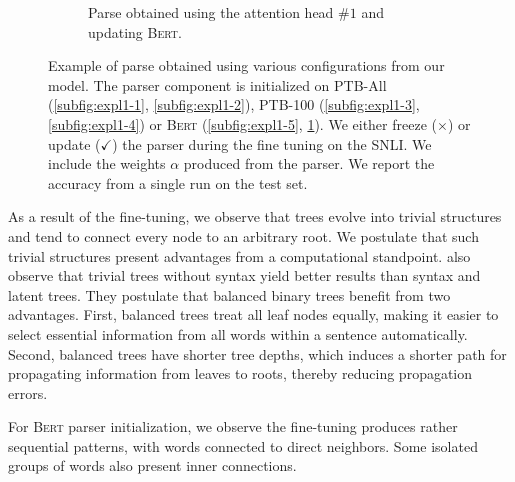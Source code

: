 \begin{figure}[htb!]
\begin{subfigure}[b]{0.475\textwidth}
        \caption{Parse obtained using the attention head \#$1$ and updating \textsc{Bert}.}
        \label{subfig:expl1-6}
    \end{subfigure}
    \caption{Example of parse obtained using various configurations from our model. The parser component is initialized on PTB-All (\ref{subfig:expl1-1}, \ref{subfig:expl1-2}), PTB-100 (\ref{subfig:expl1-3}, \ref{subfig:expl1-4}) or \textsc{Bert} (\ref{subfig:expl1-5}, \ref{subfig:expl1-6}). We either freeze ($\times$) or update ($\checkmark$) the parser during the fine tuning on the SNLI. We include the weights $\alpha$ produced from the parser. 
    We report the accuracy from a single run on the test set.} 
    \label{fig:parse-expl}
\end{figure}

As a result of the fine-tuning, we observe that trees evolve into trivial structures and tend to connect every node to an arbitrary root. We postulate that such trivial structures present advantages from a computational standpoint. \textcite{shi_18} also observe that trivial trees without syntax yield better results than syntax and latent trees. They postulate that balanced binary trees benefit from two advantages. First, balanced trees treat all leaf nodes equally, making it easier to select essential information from all words within a sentence automatically. Second, balanced trees have shorter tree depths, which induces a shorter path for propagating information from leaves to roots, thereby reducing propagation errors.

For \textsc{Bert} parser initialization, we observe the fine-tuning produces rather sequential patterns, with words connected to direct neighbors. Some isolated groups of words also present inner connections.





